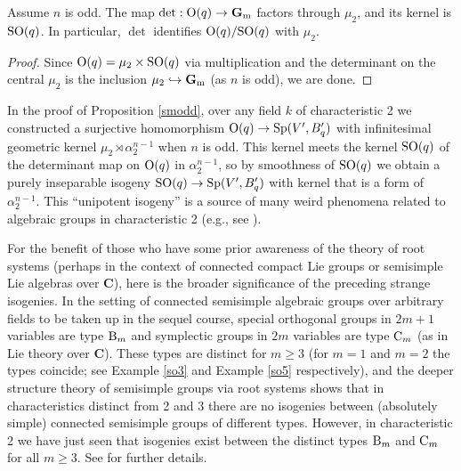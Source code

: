 \documentclass[10pt]{article}
\renewcommand{\(}{\left(}
\renewcommand{\)}{\right)}
\numberwithin{thm}{subsection}
\begin{document}
\begin{cor}\label{odddet}  Assume $n$ is odd.
The map $\det: {\rm{O}}(q) \rightarrow {\mathbf{G}}_{\rm{m}}$
factors through $\mu_2$,
and its kernel is ${\rm{SO}}(q)$.
In particular, $\det$ identifies ${\rm{O}}(q)/{\rm{SO}}(q)$ with $\mu_2$.
\end{cor}

\begin{proof}
Since ${\rm{O}}(q) = \mu_2 \times {\rm{SO}}(q)$ via multiplication
and the determinant on the central $\mu_2$ is the inclusion $\mu_2 \hookrightarrow {\mathbf{G}}_{\rm{m}}$
(as $n$ is odd), we are done.
\end{proof}

\begin{rem}\label{remblah}
In the proof of Proposition \ref{smodd},
over any field $k$ of characteristic 2 
we constructed a surjective homomorphism
${\rm{O}}(q) \rightarrow {\rm{Sp}}(V',B'_q)$ with 
infinitesimal geometric 
kernel $\mu_2 \rtimes \alpha_2^{n-1}$ when $n$ is odd.
This kernel meets the kernel ${\rm{SO}}(q)$ of the determinant map
on ${\rm{O}}(q)$ in $\alpha_2^{n-1}$, so by smoothness of
${\rm{SO}}(q)$ we obtain a purely inseparable isogeny
${\rm{SO}}(q) \rightarrow {\rm{Sp}}(V',B'_q)$
with kernel that is a form of $\alpha_2^{n-1}$.
This ``unipotent isogeny'' is a source of many weird phenomena related
to algebraic groups in characteristic 2 (e.g., see \cite[A.3]{map}). 

For the benefit of those who have some prior awareness of
the theory of root systems (perhaps in the context of connected compact Lie groups or semisimple Lie algebras
over $\mathbf{C}$), here is the broader significance of the preceding strange isogenies. 
In the setting of connected semisimple algebraic groups
over arbitrary fields to be taken up in the sequel course, special orthogonal groups in $2m+1$ variables are type ${\rm{B}}_m$ and
symplectic groups in $2m$ variables are type ${\rm{C}}_m$ (as in Lie theory over $\mathbf{C}$).  These
types are distinct for $m \ge 3$ (for $m = 1$ and $m = 2$ the types coincide; see
Example \ref{so3} and
Example \ref{so5} respectively), and the deeper structure theory of semisimple groups via
root systems shows that in characteristics distinct from 2 and 3 
there are no isogenies between (absolutely simple) connected
semisimple groups of different types. However, in characteristic 2 we have just seen that 
isogenies exist between the distinct types ${\rm{B}}_m$ and ${\rm{C}}_m$ for all $m \ge 3$.
See \cite[XXI, 7.5]{sga3} for further details. 
\end{rem}
\end{document}
